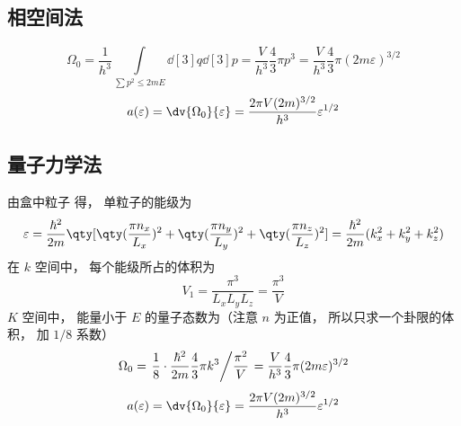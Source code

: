 
\begin{issues}
\issueDraft
\end{issues}

\subsection{相空间法}
\begin{equation}
\Omega_0 = \frac{1}{h^3}\int\limits_{\sum {p^2}  \leqslant 2mE} \dd[3]{q} \dd[3]{p}
 = \frac{V}{h^3}\frac43 \pi {p^3}
 = \frac{V}{h^3}\frac43 \pi (2m\varepsilon)^{3/2}
\end{equation}
\begin{equation}
a(\varepsilon) = \dv{\Omega_0}{\varepsilon} = \frac{2\pi V(2m)^{3/2}}{h^3} \varepsilon^{1/2}
\end{equation}

\subsection{量子力学法}
由盒中粒子%
得， 单粒子的能级为
\begin{equation}
\varepsilon = \frac{\hbar ^2}{2m} \qty[\qty(\frac{\pi n_x}{L_x})^2 + \qty(\frac{\pi n_y}{L_y})^2 + \qty(\frac{\pi n_z}{L_z})^2] = \frac{\hbar ^2}{2m} (k_x^2 + k_y^2 + k_z^2)
\end{equation}
在 $k$ 空间中， 每个能级所占的体积为
\begin{equation}
V_1 = \frac{\pi^3}{L_x L_y L_z} = \frac{\pi^3}{V}
\end{equation}
$K$ 空间中， 能量小于 $E$ 的量子态数为（注意 $n$ 为正值， 所以只求一个卦限的体积， 加 $1/8$ 系数）
\begin{equation}
\Omega_0 = \left. \frac18\cdot \frac{\hbar^2}{2m}\frac43 \pi k^3 \middle/ \frac{\pi^2}{V} \right. = \frac{V}{h^3}\frac43 \pi(2m\varepsilon)^{3/2}
\end{equation}
\begin{equation}
a(\varepsilon) = \dv{\Omega_0}{\varepsilon} = \frac{2\pi V(2m)^{3/2}}{h^3} \varepsilon^{1/2}
\end{equation}

